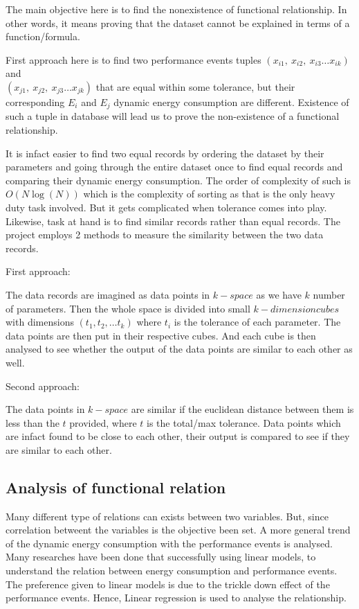 The main objective here is to find the nonexistence of functional relationship. In other words, it means proving that the dataset cannot be explained in terms of a function/formula.

First approach here is to find two performance events tuples \((x_{i1},\ x_{i2},\ x_{i3} \ldots x_{ik})\) and \\ \((x_{j1},\ x_{j2},\ x_{j3} \ldots x_{jk})\) that are equal within some tolerance, but their corresponding \(E_i\) and \(E_j\) dynamic energy consumption are different. Existence of such a tuple in database will lead us to prove the non-existence of a functional relationship.

It is infact easier to find two equal records by ordering the dataset by their parameters and going through the entire dataset once to find equal records and comparing their dynamic energy consumption. The order of complexity of such is \(O(N \log(N))\) which is the complexity of sorting as that is the only heavy duty task involved. But it gets complicated when tolerance comes into play. Likewise, task at hand is to find similar records rather than equal records. The project employs 2 methods to measure the similarity between the two data records.

First approach:

The data records are imagined as data points in \(k-space\) as we have \(k\) number of parameters. Then the whole space is divided into small \(k-dimension cubes\) with dimensions \((t_1, t_2, \ldots t_k)\) where \(t_i\) is the tolerance of each parameter. The data points are then put in their respective cubes. And each cube is then analysed to see whether the output of the data points are similar to each other as well.

Second approach:

The data points in \(k-space\) are similar if the euclidean distance between them is less than the \(t\) provided, where \(t\) is the total/max tolerance. Data points which are infact found to be close to each other, their output is compared to see if they are similar to each other.

\subsection{Analysis of functional relation}

Many different type of relations can exists between two variables. But, since correlation betweent the variables is the objective been set. A more general trend of the dynamic energy consumption with the performance events is analysed. Many researches have been done that successfully using linear models, to understand the relation between energy consumption and performance events.\cite{o2017survey} The preference given to linear models is due to the trickle down effect of the performance events.\cite{bircher2007complete} Hence, Linear regression is used to analyse the relationship.

